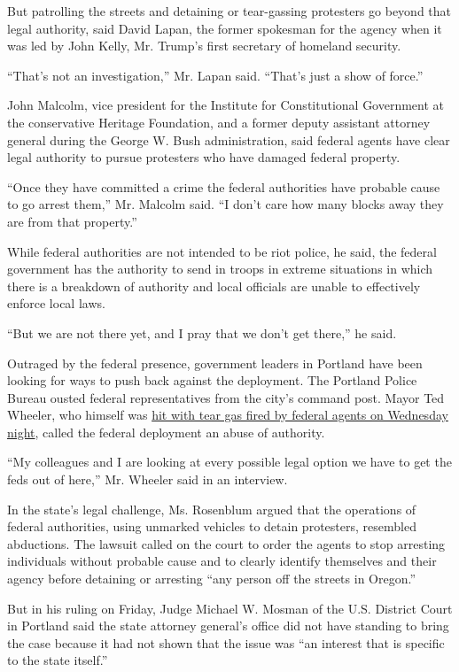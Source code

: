 But patrolling the streets and detaining or tear-gassing protesters go
beyond that legal authority, said David Lapan, the former spokesman for
the agency when it was led by John Kelly, Mr. Trump's first secretary of
homeland security.

``That's not an investigation,'' Mr. Lapan said. ``That's just a show of
force.''

John Malcolm, vice president for the Institute for Constitutional
Government at the conservative Heritage Foundation, and a former deputy
assistant attorney general during the George W. Bush administration,
said federal agents have clear legal authority to pursue protesters who
have damaged federal property.

``Once they have committed a crime the federal authorities have probable
cause to go arrest them,'' Mr. Malcolm said. ``I don't care how many
blocks away they are from that property.''

While federal authorities are not intended to be riot police, he said,
the federal government has the authority to send in troops in extreme
situations in which there is a breakdown of authority and local
officials are unable to effectively enforce local laws.

``But we are not there yet, and I pray that we don't get there,'' he
said.

Outraged by the federal presence, government leaders in Portland have
been looking for ways to push back against the deployment. The Portland
Police Bureau ousted federal representatives from the city's command
post. Mayor Ted Wheeler, who himself was
\href{https://www.nytimes3xbfgragh.onion/2020/07/23/us/portland-protest-tear-gas-mayor.html}{hit
with tear gas fired by federal agents on Wednesday night}, called the
federal deployment an abuse of authority.

``My colleagues and I are looking at every possible legal option we have
to get the feds out of here,'' Mr. Wheeler said in an interview.

In the state's legal challenge, Ms. Rosenblum argued that the operations
of federal authorities, using unmarked vehicles to detain protesters,
resembled abductions. The lawsuit called on the court to order the
agents to stop arresting individuals without probable cause and to
clearly identify themselves and their agency before detaining or
arresting ``any person off the streets in Oregon.''

But in his ruling on Friday, Judge Michael W. Mosman of the U.S.
District Court in Portland said the state attorney general's office did
not have standing to bring the case because it had not shown that the
issue was ``an interest that is specific to the state itself.''

